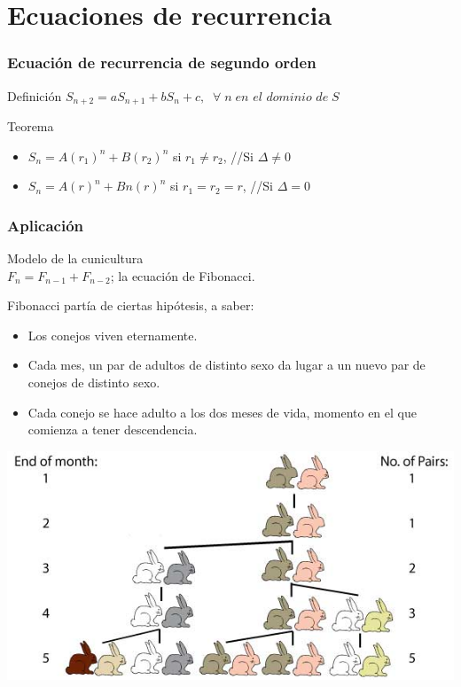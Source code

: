 \documentclass{beamer}
\begin{document}
	
\section{Ecuaciones de recurrencia}
\begin{frame}
	\frametitle{Ecuación de recurrencia de segundo orden}
	\begin{block}{Definición}
	$S_{n+2} = aS_{n+1} + bS_{n} + c, \;\; \forall\; n \; \textit{en el dominio de} \; S$
		 
	\end{block}
	\begin{block}{Teorema }
	\begin{itemize}
	    \item $S_n = A(r_1)^n + B(r_2)^n$ si $r_1 \neq r_2$, \;\;\;\;\;\;\;\;\;\;\;\;\;\;\;\;\;\; //Si $\Delta \neq 0$
	    \item $S_n = A(r)^n + Bn(r)^n$ si $r_1 = r_2 = r$, \;\;\;\;\;\;\;\;\;\;\; //Si $\Delta = 0$
	\end{itemize}
	\end{block}
\end{frame}

\begin{frame}
			\frametitle{Aplicación}
		\begin{block}{Modelo de la cunicultura\\
		$F_n = F_{n-1} + F_{n-2}$;  la ecuación de Fibonacci.}
				\begin{minipage}{7cm}
			Fibonacci partía de ciertas hipótesis, a saber:
\begin{itemize}
    \item Los conejos viven eternamente.
    \item Cada mes, un par de adultos de distinto sexo da lugar a un nuevo par de conejos de distinto sexo.
    \item Cada conejo se hace adulto a los dos meses de vida, momento en el que comienza a tener descendencia.
\end{itemize}		
				\end{minipage}\hspace{0.3cm}
				\begin{minipage}{4cm}
				\includegraphics[scale=0.22]{conejos.jpg}
				\end{minipage}
				
			\end{block}
		\end{frame}
\end{document}
